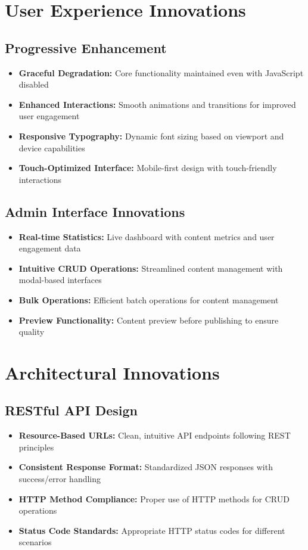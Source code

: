 \documentclass[12pt,a4paper]{report}
\begin{document}
\section{User Experience Innovations}

\subsection{Progressive Enhancement}
\begin{itemize}
    \item \textbf{Graceful Degradation:} Core functionality maintained even with JavaScript disabled
    \item \textbf{Enhanced Interactions:} Smooth animations and transitions for improved user engagement
    \item \textbf{Responsive Typography:} Dynamic font sizing based on viewport and device capabilities
    \item \textbf{Touch-Optimized Interface:} Mobile-first design with touch-friendly interactions
\end{itemize}

\subsection{Admin Interface Innovations}
\begin{itemize}
    \item \textbf{Real-time Statistics:} Live dashboard with content metrics and user engagement data
    \item \textbf{Intuitive CRUD Operations:} Streamlined content management with modal-based interfaces
    \item \textbf{Bulk Operations:} Efficient batch operations for content management
    \item \textbf{Preview Functionality:} Content preview before publishing to ensure quality
\end{itemize}

\section{Architectural Innovations}

\subsection{RESTful API Design}
\begin{itemize}
    \item \textbf{Resource-Based URLs:} Clean, intuitive API endpoints following REST principles
    \item \textbf{Consistent Response Format:} Standardized JSON responses with success/error handling
    \item \textbf{HTTP Method Compliance:} Proper use of HTTP methods for CRUD operations
    \item \textbf{Status Code Standards:} Appropriate HTTP status codes for different scenarios
\end{itemize}
\end{document}
